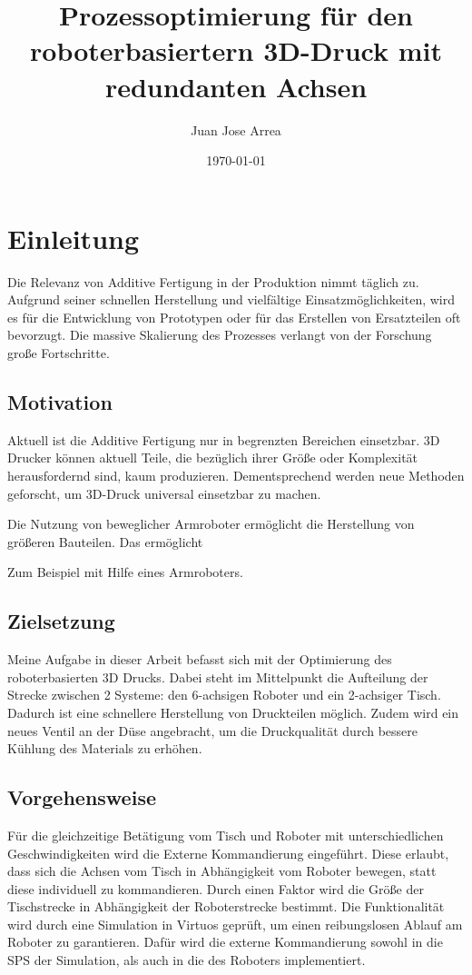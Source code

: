 \documentclass[ a4paper,
                toc=bibliography
              ]{scrartcl}
\author{Juan Jose Arrea}
\title{Prozessoptimierung für den roboterbasiertern 3D-Druck mit redundanten Achsen}
\date{\today}
\begin{document}
\maketitle
	
\section{Einleitung}

Die Relevanz von Additive Fertigung in der Produktion nimmt täglich zu. Aufgrund seiner schnellen Herstellung und vielfältige Einsatzmöglichkeiten, wird es für die Entwicklung von Prototypen oder für das Erstellen von Ersatzteilen oft bevorzugt. Die massive Skalierung des Prozesses verlangt von der Forschung große Fortschritte.

\subsection{Motivation}

Aktuell ist die Additive Fertigung nur in begrenzten Bereichen einsetzbar. 3D Drucker können aktuell Teile, die bezüglich ihrer Größe oder Komplexität herausfordernd sind, kaum produzieren. Dementsprechend werden neue Methoden geforscht, um 3D-Druck universal einsetzbar zu machen.

Die Nutzung von beweglicher Armroboter ermöglicht die Herstellung von größeren Bauteilen. Das ermöglicht 

Zum Beispiel mit Hilfe eines Armroboters.


\subsection{Zielsetzung}

Meine Aufgabe in dieser Arbeit befasst sich mit der Optimierung des roboterbasierten 3D Drucks. Dabei steht im Mittelpunkt die Aufteilung der Strecke zwischen 2 Systeme: den 6-achsigen Roboter und ein 2-achsiger Tisch. Dadurch ist eine schnellere Herstellung von Druckteilen möglich.
Zudem wird ein neues Ventil an der Düse angebracht, um die Druckqualität durch bessere Kühlung des Materials zu erhöhen. 


\subsection{Vorgehensweise}
Für die gleichzeitige Betätigung vom Tisch und Roboter mit unterschiedlichen Geschwindigkeiten wird die Externe Kommandierung eingeführt. Diese erlaubt, dass sich die Achsen vom Tisch in Abhängigkeit vom Roboter bewegen, statt diese individuell zu kommandieren. Durch einen Faktor wird die Größe der Tischstrecke in Abhängigkeit der Roboterstrecke bestimmt.
Die Funktionalität wird durch eine Simulation in Virtuos geprüft, um einen reibungslosen Ablauf am Roboter zu garantieren. Dafür wird die externe Kommandierung sowohl in die SPS der Simulation, als auch in die des Roboters implementiert.
\end{document}
